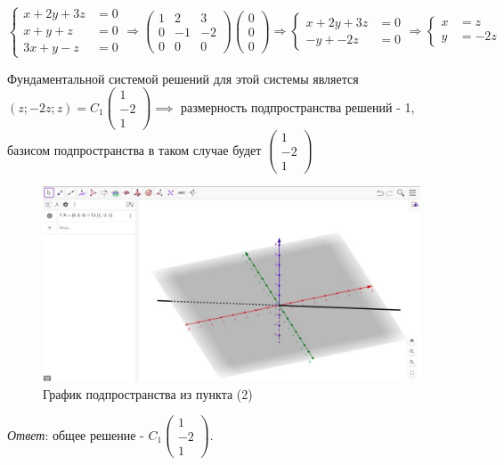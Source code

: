 \begin{enumerate}
    $\begin{cases}
              x + 2y + 3z &= 0 \\
              x + y + z &= 0 \\
              3x + y - z &= 0
    \end{cases} \Longrightarrow
    \begin{pmatrix}1 & 2 & 3\\ 0 & -1 & -2 \\ 0 & 0 & 0\end{pmatrix}\begin{pmatrix}0 \\ 0 \\ 0\end{pmatrix} \Longrightarrow
    \begin{cases}
              x + 2y + 3z &= 0 \\
              -y + -2z &= 0
    \end{cases}  \Longrightarrow
    \begin{cases}
              x &= z \\
              y &= -2z
    \end{cases}$

    Фундаментальной системой решений для этой системы является $(z; -2z; z) = C_1\begin{pmatrix}1 \\ -2 \\ 1\end{pmatrix} \implies$
    размерность подпространства решений - 1, базисом подпространства в таком случае будет $\begin{pmatrix}1 \\ -2 \\ 1\end{pmatrix}$

    \begin{figure}
        \centering
        \includegraphics[width=500pt]{images/3b1}
        \caption{График подпространства из пункта (2)}
        \label{fig:}
    \end{figure}

    \textit{Ответ}: общее решение - $C_1\begin{pmatrix}1 \\ -2 \\ 1\end{pmatrix}$.

\end{enumerate}

\clearpage
